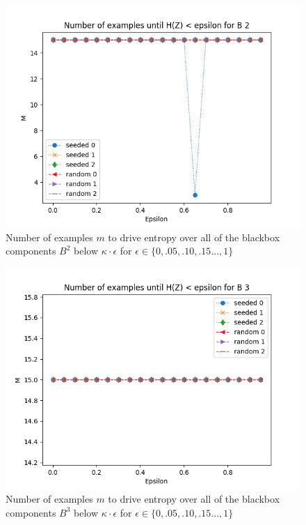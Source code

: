 \documentclass[letterpaper,twocolumn,10pt]{article}
\begin{document}
\begin{figure}
\begin{centering}
\includegraphics[width=\linewidth]{figs/seeded_2.png}
\end{centering}
\caption{\label{fig:b2} Number of examples $m$ to drive entropy over all of the blackbox components $B^{2}$ below $\kappa \cdot \epsilon$ for $\epsilon \in \{0, .05, .10, .15...,1\}$}
\end{figure}

\begin{figure}
\begin{centering}
\includegraphics[width=\linewidth]{figs/seeded_3.png}
\end{centering}
\caption{\label{fig:b3} Number of examples $m$ to drive entropy over all of the blackbox components $B^{3}$ below $\kappa \cdot \epsilon$ for $\epsilon \in \{0, .05, .10, .15...,1\}$ }
\end{figure}
\end{document}
